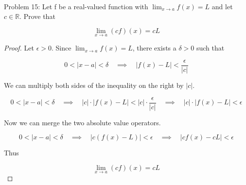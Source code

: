 \usepackage{amsthm}

Problem 15: Let f be a real-valued function with $\lim_{x \rightarrow a} f(x) = L$ and let $c \in \mathbb{R}$. Prove that 

$$ \lim_{x \rightarrow a} (cf)(x) = cL $$

\begin{proof}
Let $\epsilon > 0$. Since $\lim_{x \rightarrow a} f(x) = L$, there exists a $\delta > 0$ such that

$$ 0 < |x - a| < \delta \quad \implies \quad |f(x) - L| < \frac{\epsilon}{|c|} $$

We can multiply both sides of the inequality on the right by $|c|$.

$$ 0 < |x - a| < \delta \quad \implies \quad |c| \cdot |f(x) - L| < |c| \cdot \frac{\epsilon}{|c|} \quad \implies \quad |c| \cdot |f(x) - L| < \epsilon $$

Now we can merge the two absolute value operators.

$$ 0 < |x - a| < \delta \quad \implies \quad |c(f(x) - L)| < \epsilon \quad \implies \quad |cf(x) - cL| < \epsilon $$

Thus

$$ \lim_{x \rightarrow a} (cf)(x) = cL $$
\end{proof}

